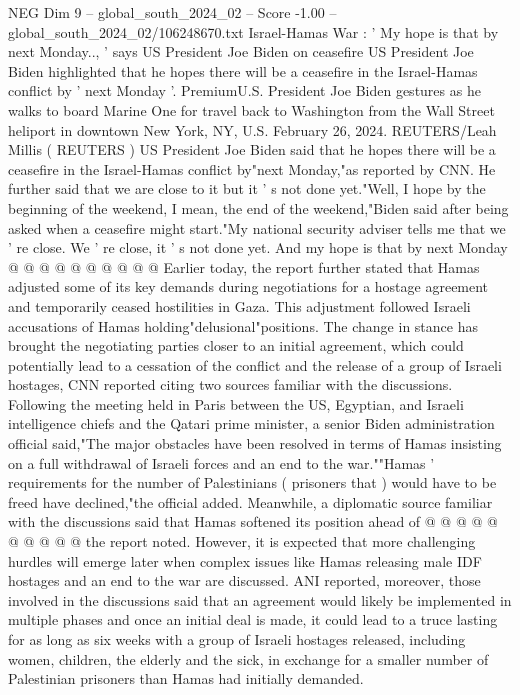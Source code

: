 \begin{textsample}{NEG Dim 9 – global\_south\_2024\_02 – Score -1.00 – global\_south\_2024\_02/106248670.txt}  \label{ex:f9_neg_359}
Israel-Hamas War : ' My hope is that by next Monday.., ' says US President Joe Biden on ceasefire US President Joe Biden highlighted that he hopes there will be a ceasefire in the Israel-Hamas conflict by ' next Monday '.
PremiumU.S.
President Joe Biden gestures as he walks to board Marine One for travel back to Washington from the Wall Street heliport in downtown New York, NY, U.S.
February 26, 2024.
REUTERS/Leah Millis ( REUTERS ) US President Joe Biden said that he hopes there will be a ceasefire in the Israel-Hamas conflict by"next Monday,"as reported by CNN.
He further said that we are close to it but it ' s not done yet."Well, I hope by the beginning of the weekend, I mean, the end of the weekend,"Biden said after being asked when a ceasefire might start."My national security adviser tells me that we ' re close.
We ' re close, it ' s not done yet.
And my hope is that by next Monday @ @ @ @ @ @ @ @ @ @ Earlier today, the report further stated that Hamas adjusted some of its key demands during negotiations for a hostage agreement and temporarily ceased hostilities in Gaza.
This adjustment followed Israeli accusations of Hamas holding"delusional"positions.
The change in stance has brought the negotiating parties closer to an initial agreement, which could potentially lead to a cessation of the conflict and the release of a group of Israeli hostages, CNN reported citing two sources familiar with the discussions.
Following the meeting held in Paris between the US, Egyptian, and Israeli intelligence chiefs and the Qatari prime minister, a senior Biden administration official said,"The major obstacles have been resolved in terms of Hamas insisting on a full withdrawal of Israeli forces and an end to the war.""Hamas ' requirements for the number of Palestinians ( prisoners that ) would have to be freed have declined,"the official added.
Meanwhile, a diplomatic source familiar with the discussions said that Hamas softened its position ahead of @ @ @ @ @ @ @ @ @ @ the report noted.
However, it is expected that more challenging hurdles will emerge later when complex issues like Hamas releasing male IDF hostages and an end to the war are discussed.
ANI reported, moreover, those involved in the discussions said that an agreement would likely be implemented in multiple phases and once an initial deal is made, it could lead to a truce lasting for as long as six weeks with a group of Israeli hostages released, including women, children, the elderly and the sick, in exchange for a smaller number of Palestinian prisoners than Hamas had initially demanded.

\end{textsample}
